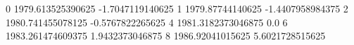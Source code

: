 0 1979.613525390625 -1.7047119140625
1 1979.87744140625 -1.4407958984375
2 1980.741455078125 -0.5767822265625
4 1981.3182373046875 0.0
6 1983.261474609375 1.9432373046875
8 1986.92041015625 5.6021728515625
